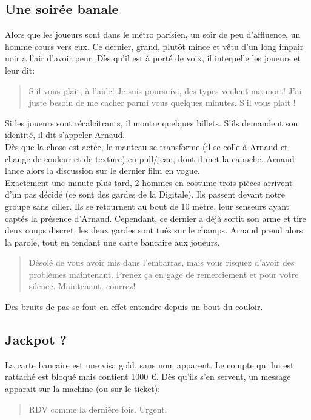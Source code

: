 \documentclass[10pt,a4paper,twocolumn]{article}
\begin{document}
\subsection{Une soirée banale}
Alors que les joueurs sont dans le métro parisien, un soir de peu d'affluence, un homme cours vers eux. Ce dernier, grand, plutôt mince et vêtu d'un long impair noir a l'air d'avoir peur. Dès qu'il est à porté de voix, il interpelle les joueurs et leur dit:
\begin{quote}
S'il vous plait, à l'aide! Je suis poursuivi, des types veulent ma mort! J'ai juste besoin de me cacher parmi vous quelques minutes. S'il vous plait !
\end{quote}
Si les joueurs sont récalcitrants, il montre quelques billets. S'ils demandent son identité, il dit s'appeler Arnaud.
\\
Dès que la chose est actée, le manteau se transforme (il se colle à Arnaud et change de couleur et de texture) en pull/jean, dont il met la capuche. Arnaud lance alors la discussion sur le dernier film en vogue.\\
Exactement une minute plus tard, 2 hommes en costume trois pièces arrivent d'un pas décidé (ce sont des gardes de la Digitale). Ils passent devant notre groupe sans ciller. Ils se retournent au bout de 10 mètre, leur senseurs ayant captés la présence d'Arnaud. Cependant, ce dernier a déjà sortit son arme et tire deux coups discret, les deux gardes sont tués sur le champs. Arnaud prend alors la parole, tout en tendant une carte bancaire aux joueurs.
\begin{quote}
Désolé de vous avoir mis dans l'embarras, mais vous risquez d'avoir des problèmes maintenant. Prenez ça en gage de remerciement et pour votre silence. Maintenant, courrez!
\end{quote}
Des bruits de pas se font en effet entendre depuis un bout du couloir.
\subsection{Jackpot ?}
La carte bancaire est une visa gold, sans nom apparent. Le compte qui lui est rattaché est bloqué mais contient 1000 €. Dès qu'ils s'en servent, un message apparait sur la machine (ou sur le ticket): 
\begin{quote}
RDV comme la dernière fois. Urgent.
\end{quote}
\end{document}
